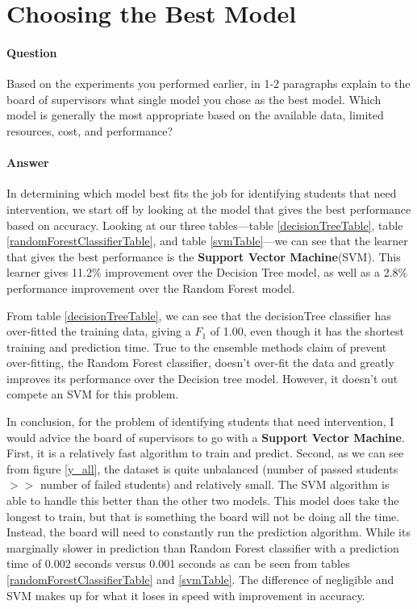 \documentclass[twoside,openright,titlepage,numbers=noenddot,headinclude,%
               footinclude=true,cleardoublepage=empty,abstractoff,BCOR=5mm,%
               paper=a4,fontsize=11pt,ngerman,american]{scrreprt}
\numberwithin{theorem}{chapter}
\numberwithin{definition}{chapter}
\numberwithin{algorithm}{chapter}
\numberwithin{figure}{chapter}
\numberwithin{table}{chapter}
\numberwithin{equation}{chapter}
\begin{document}

\section*{Choosing the Best Model}

\paragraph{\textbf{Question}} Based on the experiments you performed earlier, in 1-2 paragraphs explain to the board of supervisors what single model you chose as the best model. Which model is generally the most appropriate based on the available data, limited resources, cost, and performance?

\paragraph{\textbf{Answer}} In determining which model best fits the job for identifying students that need intervention, we start off by looking at the model that gives the best performance based on accuracy. Looking at our three tables---table \ref{decisionTreeTable}, table \ref{randomForestClassifierTable}, and table \ref{svmTable}---we can see that the learner that gives the best performance is the \textbf{Support Vector Machine}(SVM). This learner gives 11.2\% improvement over the Decision Tree model, as well as a 2.8\% performance improvement over the Random Forest model.

From table \ref{decisionTreeTable}, we can see that the decisionTree classifier has over-fitted the training data, giving a $F_1$ of 1.00, even though it has the shortest training and prediction time. True to the ensemble methods claim of prevent over-fitting, the Random Forest classifier, doesn't over-fit the data and greatly improves its performance over the Decision tree model. However, it doesn't out compete an SVM for this problem.

In conclusion, for the problem of identifying students that need intervention, I would advice the board of supervisors to go with a \textbf{Support Vector Machine}. First, it is a relatively fast algorithm to train and predict. Second, as we can see from figure \ref{y_all}, the dataset is quite unbalanced (number of passed students $>>$ number of failed students) and relatively small. The SVM algorithm is able to handle this better than the other two models. This model does take the longest to train, but that is something the board will not be doing all the time. Instead, the board will need to constantly run the prediction algorithm. While its marginally slower in prediction than Random Forest classifier with a prediction time of 0.002 seconds versus 0.001 seconds as can be seen from tables \ref{randomForestClassifierTable} and \ref{svmTable}. The difference of negligible and SVM makes up for what it loses in speed with improvement in accuracy.
\end{document}
